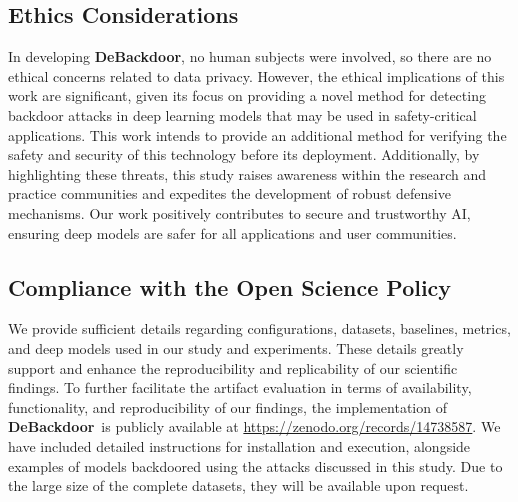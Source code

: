 \documentclass[letterpaper,twocolumn,10pt]{article}
\newcommand{\Z}{\textbf{DeBackdoor}}
\begin{document}
\subsection*{Ethics Considerations}
 
In developing \Z, no human subjects were involved, so there are no ethical concerns related to data privacy. However, the ethical implications of this work are significant, given its focus on providing a novel method for detecting backdoor attacks in deep learning models that may be used in safety-critical applications. This work intends to provide an additional method for verifying the safety and security of this technology before its deployment. Additionally, by highlighting these threats, this study raises awareness within the research and practice communities and expedites the development of robust defensive mechanisms. Our work positively contributes to secure and trustworthy AI, ensuring deep models are safer for all applications and user communities.
 
\subsection*{Compliance with the Open Science Policy}
 
We provide sufficient details regarding configurations, datasets, baselines, metrics, and deep models used in our study and experiments. These details greatly support and enhance the reproducibility and replicability of our scientific findings. To further facilitate the artifact evaluation in terms of availability, functionality, and reproducibility of our findings, the implementation of \Z\ is publicly available at \href{https://zenodo.org/records/14738587}{https://zenodo.org/records/14738587}. We have included detailed instructions for installation and execution, alongside examples of models backdoored using the attacks discussed in this study. Due to the large size of the complete datasets, they will be available upon request.



\end{document}
